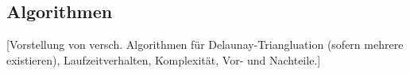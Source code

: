 \subsection{Algorithmen}
[Vorstellung von versch. Algorithmen für Delaunay-Triangluation (sofern mehrere existieren), Laufzeitverhalten, Komplexität, Vor- und Nachteile.]
